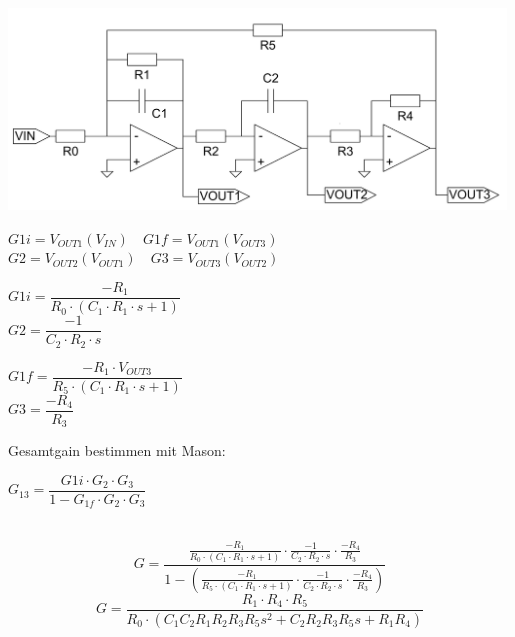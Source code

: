 \begin{minipage}{0.49\textwidth}
\includegraphics[width = 0.99\textwidth]{pictures/filter.png}
\end{minipage}
\begin{minipage}{0.49\textwidth}
$
G1i = V_{OUT1}(V_{IN})\quad G1f = V_{OUT1}(V_{OUT3})
$\\
$
G2 = V_{OUT2}(V_{OUT1}) \quad G3 = V_{OUT3}(V_{OUT2})
$\\[1em]
\begin{minipage}[t]{0.49\textwidth}
$
G1i = \dfrac{-R_1}{R_0\cdot(C_1\cdot R_1\cdot s+1)}
$\\
$
G2 = \dfrac{-1}{C_2\cdot R_2\cdot s}
$	
\end{minipage}
\begin{minipage}[t]{0.49\textwidth}
$
G1f = \dfrac{-R_1\cdot V_{OUT3}}{R_5\cdot(C_1\cdot R_1\cdot s+1)}
$\\
$
G3 = \dfrac{-R_4}{R_3}
$
\end{minipage}

\begin{minipage}[t]{0.39\textwidth}
Gesamtgain bestimmen mit Mason:
\end{minipage}\hfill
\begin{minipage}[t]{0.49\textwidth}
$
G_{13} = \dfrac{G1i\cdot G_2\cdot G_3}{1-G_{1f}\cdot G_2\cdot G_3}
$
\end{minipage}\\
\[
G = \dfrac{\frac{-R_1}{R_0\cdot(C_1\cdot R_1\cdot s+1)}\cdot \frac{-1}{C_2\cdot R_2\cdot s}\cdot \frac{-R_4}{R_3}}{1-\left(\frac{-R_1}{R_5\cdot(C_1\cdot R_1\cdot s+1)}\cdot 	\frac{-1}{C_2\cdot R_2\cdot s}\cdot \frac{-R_4}{R_3}\right)}
\]
\[
G = \frac{R_1\cdot R_4\cdot R_5}{R_0\cdot \left(C_1C_2R_1R_2R_3R_5 s^2 + C_2R_2R_3R_5 s + R_1R_4\right)}
\]
\end{minipage}


